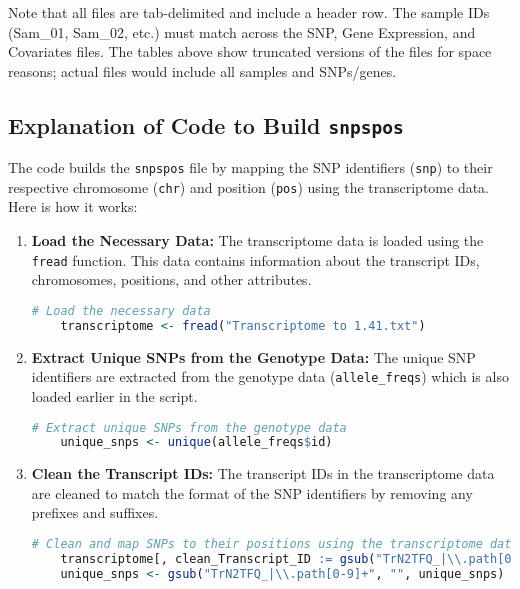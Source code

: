 \documentclass[12pt,a4paper]{article}
\begin{document}
Note that all files are tab-delimited and include a header row. The sample IDs (Sam\_01, Sam\_02, etc.) must match across the SNP, Gene Expression, and Covariates files. The tables above show truncated versions of the files for space reasons; actual files would include all samples and SNPs/genes.

\subsection{Explanation of Code to Build \texttt{snpspos}}

The code builds the \texttt{snpspos} file by mapping the SNP identifiers (\texttt{snp}) to their respective chromosome (\texttt{chr}) and position (\texttt{pos}) using the transcriptome data. Here is how it works:

\begin{enumerate}
    \item \textbf{Load the Necessary Data:} The transcriptome data is loaded using the \texttt{fread} function. This data contains information about the transcript IDs, chromosomes, positions, and other attributes.
    \begin{lstlisting}[language=R]
    # Load the necessary data
    transcriptome <- fread("Transcriptome to 1.41.txt")
    \end{lstlisting}

    \item \textbf{Extract Unique SNPs from the Genotype Data:} The unique SNP identifiers are extracted from the genotype data (\texttt{allele\_freqs}) which is also loaded earlier in the script.
    \begin{lstlisting}[language=R]
    # Extract unique SNPs from the genotype data
    unique_snps <- unique(allele_freqs$id)
    \end{lstlisting}

    \item \textbf{Clean the Transcript IDs:} The transcript IDs in the transcriptome data are cleaned to match the format of the SNP identifiers by removing any prefixes and suffixes.
    \begin{lstlisting}[language=R]
    # Clean and map SNPs to their positions using the transcriptome data
    transcriptome[, clean_Transcript_ID := gsub("TrN2TFQ_|\\.path[0-9]+", "", Transcript_ID)]
    unique_snps <- gsub("TrN2TFQ_|\\.path[0-9]+", "", unique_snps)
    \end{lstlisting}


\end{enumerate}
\end{document}
